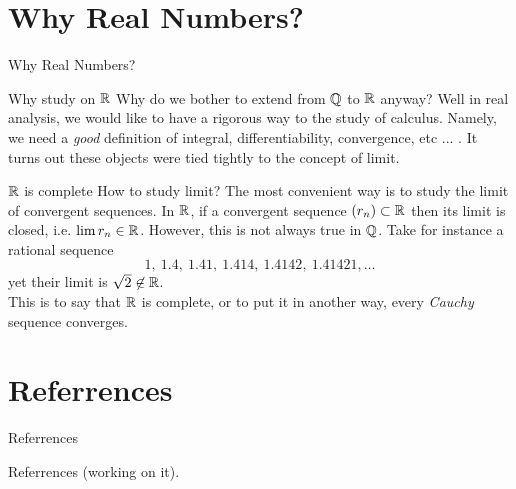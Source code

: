 \documentclass{beamer}
\begin{document}
\section{Why Real Numbers?}
\begin{frame}[plain]
  \begin{center}
    {\huge\color{blue} Why Real Numbers?}
  \end{center}
\end{frame}
\begin{frame}{Why study on $\R$}
  Why do we bother to extend from $\Q$ to $\R$
  anyway? Well in real analysis, we would like to have 
  a rigorous way to the study of calculus. Namely, we
  need a \emph{good} definition of integral, differentiability,
  convergence, etc ... .
  \pause
  It turns out these objects were tied tightly to
  the concept of limit.\\[0.3cm]
\end{frame}
\begin{frame}{$\R$ is complete}
  How to study limit? The most convenient way is to study the limit
  of convergent sequences. \pause
  In $\R$, if a convergent sequence $(r_n)\subset\R$ then its 
  limit is closed, i.e. $\lim r_n\in\R$.
  \pause
  However, this is not always true in $\Q$. Take for instance
  a rational sequence
  \[1,  ~1.4, ~1.41, ~1.414, ~1.4142, ~1.41421, \dots \]
  yet their limit is $\sqrt 2\not\in\R$.\\[0.3cm]
  \pause
  This is to say that $\R$ is complete, or to put it in another way,
  every \emph{Cauchy} sequence converges.
\end{frame}
\section{Referrences}
\begin{frame}[plain]
  \begin{center}
    {\huge\color{blue} Referrences}
  \end{center}
\end{frame}
\begin{frame}{Referrences}
  (working on it).
\end{frame}
\end{document}

